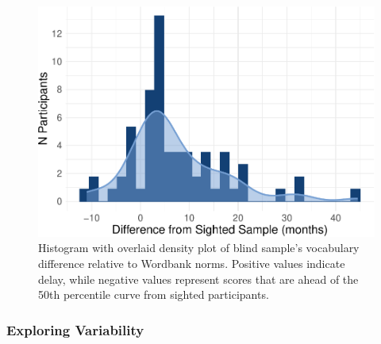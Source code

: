 \documentclass[
  man,floatsintext]{apa6}
\begin{document}
\begin{figure}
\centering
\includegraphics{VI_CDI_manuscript_files/figure-latex/density-plot-1.pdf}
\caption{\label{fig:density-plot}Histogram with overlaid density plot of blind sample's vocabulary difference relative to Wordbank norms. Positive values indicate delay, while negative values represent scores that are ahead of the 50th percentile curve from sighted participants.}
\end{figure}

\hypertarget{exploring-variability}{%
\subsubsection{Exploring Variability}\label{exploring-variability}}
\end{document}
